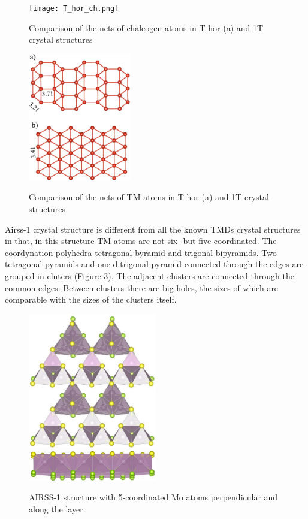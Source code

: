 \documentclass[a4paperm]{article}
\begin{document}
\begin{figure}[H]
	\texttt{[image: T\_hor\_ch.png]} \\
	\caption{Comparison of the nets of chalcogen atoms in T-hor (a) and 1T crystal structures }
	\label{T_hor_ch}
\end{figure}

\begin{figure}[H]
	\includegraphics[width=0.4\textwidth]{T_hor_V.png} \\
	\caption{Comparison of the nets of TM atoms in T-hor (a) and 1T crystal structures }
	\label{T_hor_V}
\end{figure}

Airss-1 crystal structure is different from all the known TMDs crystal structures in that, in this structure TM atoms are not six- but five-coordinated.
The coordynation polyhedra tetragonal byramid and trigonal bipyramids.
Two tetragonal pyramids and one ditrigonal pyramid connected through the edges are grouped in cluters (Figure \ref{airss-1}).
The adjacent clusters are connected through the common edges.
Between clusters there are big holes, the sizes of which are comparable with the sizes of the clusters itself.

\begin{figure}[H]
        \includegraphics[width=0.5\textwidth]{airss-1-1.jpg} \\ \vspace{3mm}
        \includegraphics[width=0.5\textwidth]{airss-1-2.jpg}
        \caption{AIRSS-1 structure with 5-coordinated Mo atoms perpendicular and along the layer.}
\label{airss-1}
\end{figure}
\end{document}
